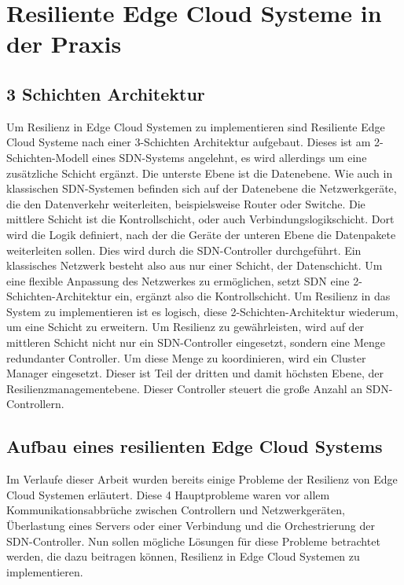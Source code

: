 \newpage
\section{Resiliente Edge Cloud Systeme in der Praxis} \label{latexDetails}

\subsection{3 Schichten Architektur}

Um Resilienz in Edge Cloud Systemen zu implementieren sind Resiliente Edge Cloud Systeme nach einer 3-Schichten Architektur aufgebaut. Dieses ist am 2-Schichten-Modell eines \ac{SDN}-Systems angelehnt, 
es wird allerdings um eine zusätzliche Schicht ergänzt. Die unterste Ebene ist die Datenebene. Wie auch in klassischen \ac{SDN}-Systemen befinden sich auf der Datenebene die Netzwerkgeräte, die den Datenverkehr weiterleiten, 
beispielsweise Router oder Switche. Die mittlere Schicht ist die Kontrollschicht, oder auch Verbindungslogikschicht. Dort wird die Logik definiert, nach der die Geräte der unteren Ebene die Datenpakete weiterleiten sollen. 
Dies wird durch die \ac{SDN}-Controller durchgeführt. Ein klassisches Netzwerk besteht also aus nur einer Schicht, der Datenschicht. Um eine flexible Anpassung des Netzwerkes zu ermöglichen, 
setzt \ac{SDN} eine 2-Schichten-Architektur ein, ergänzt also die Kontrollschicht. Um Resilienz in das System zu implementieren ist es logisch, diese 2-Schichten-Architektur wiederum, um eine Schicht zu erweitern. 
Um Resilienz zu gewährleisten, wird auf der mittleren Schicht nicht nur ein \ac{SDN}-Controller eingesetzt, sondern eine Menge redundanter Controller. Um diese Menge zu koordinieren, wird ein Cluster Manager eingesetzt. 
Dieser ist Teil der dritten und damit höchsten Ebene, der Resilienzmanagementebene. Dieser Controller steuert die große Anzahl an \ac{SDN}-Controllern.



\subsection{Aufbau eines resilienten Edge Cloud Systems}


Im Verlaufe dieser Arbeit wurden bereits einige Probleme der Resilienz von Edge Cloud Systemen erläutert. Diese 4 Hauptprobleme waren vor allem Kommunikationsabbrüche zwischen Controllern und Netzwerkgeräten, 
Überlastung eines Servers oder einer Verbindung und die Orchestrierung der \ac{SDN}-Controller. Nun sollen mögliche Lösungen für diese Probleme betrachtet werden, die dazu beitragen können, 
Resilienz in Edge Cloud Systemen zu implementieren. 

